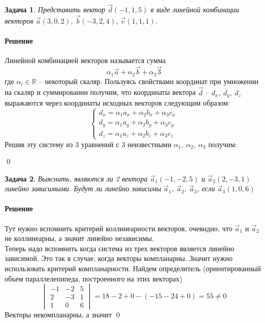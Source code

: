 \documentclass[a4paper,12pt]{report}
\newcommand{\R}{{\mathbb R}}
\newtheorem{problem}{Задача}[chapter]
\newenvironment{sol}{\paragraph{Решение}}{}
\begin{document}
	\begin{problem}
		Представить вектор $\vec{d}(-1,1,5)$ в виде линейной комбинации векторов $\vec{a}(3,0,2)$, $\vec{b}(-3,2,4)$, $\vec{c}(1,1,1)$.
	\end{problem}
	\begin{sol}
		Линейной комбинацией векторов называется сумма
		\[
		\alpha_1 \vec{a} + \alpha_2 \vec{b} + \alpha_3 \vec{3}
		\]
		где $\alpha_i\in \R$ -- некоторый скаляр. Пользуясь свойствами координат при умножении на скаляр и суммировании получим, что координаты вектора $\vec{d}$ -- $d_x, \ d_y, \ d_z$ выражаются через координаты исходных векторов следующим образом:
		\begin{equation*}
			\begin{cases}
				d_x=\alpha_1 a_x + \alpha_2 b_x + \alpha_3 c_x\\
				d_y=\alpha_1 a_y + \alpha_2 b_y + \alpha_3 c_y\\
				d_z=\alpha_1 a_z + \alpha_2 b_z + \alpha_3 c_z
			\end{cases}
		\end{equation*}
		Решив эту систему из 3 уравнений с 3 неизвестными $\alpha_1, \ \alpha_2, \ \alpha_3$ получим:
		\begin{center}
		\end{center}
		\qed
	\end{sol}
	
	\begin{problem}
		Выяснить, являются ли 2 вектора $\vec{a}_1(-1,-2,5)$ и $\vec{a}_2(2,-3,1)$ линейно зависимыми. Будут ли линейно зависимы $\vec{a}_1, \ \vec{a}_2, \ \vec{a}_3$, если $\vec{a}_3(1,0,6)$
	\end{problem}
	\begin{sol}
		Тут нужно вспомнить критерий коллинеарности векторов, очевидно, что $\vec{a}_1$ и $\vec{a}_2$ не коллинеарны, а значит линейно независимы.\\
		
		Теперь надо вспомнить когда система из трех векторов является линейно зависимой. Это так в случае, когда векторы компланарны. Значит нужно использовать критерий компланарности. Найдем определитель (ориентированный объем параллелепипеда, построенного на этих векторах)
		\begin{equation*}
			\begin{vmatrix}
				-1 & -2 & 5\\
				2 & -3 & 1\\
				1 & 0 & 6
			\end{vmatrix}=18-2+0-(-15-24+0)=55\neq0
		\end{equation*}
		Векторы некомпланарны, а значит 
		\qed
	\end{sol}
	
\end{document}
